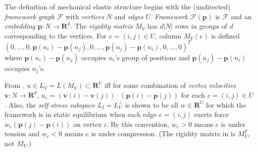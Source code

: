 \documentclass{article}
\def\Reals{\ensuremath{\mathbf R}}
\newcommand{\extra}[1]{}
\begin{document}
The definition of mechanical elastic structure begins with the 
(undirected) \textit{framework graph} $\mathcal{F}$ with \textit{vertices}
$N$ and \textit{edges} $U$.  \textit{Framework} $\mathcal{F}(\mathbf{p})$ 
is 
$\mathcal{F}$ and an \textit{embedding} 
$\mathbf{p}:N\rightarrow \Reals^d$.  
The \textit{rigidity matrix} $M_V$ 
has $d|N|$ rows in groups of $d$ corresponding to the vertices.
For $e=(i,j)\in U$, column $M_V(e)$ 
is defined \cite{RigidityBook}\\
$(0, \ldots,0, \mathbf{p}(n_i)-\mathbf{p}(n_j),0,\ldots,
\mathbf{p}(n_j)-\mathbf{p}(n_i), 0, \ldots,0)^T$\\
where $\mathbf{p}(n_i)-\mathbf{p}(n_j)$ occupies 
$n_i$'s group of positions
and $\mathbf{p}(n_j)-\mathbf{p}(n_i)$
occupies $n_j$'s.
\extra{This definition is echoed from the 
literature \cite{RigidityBook} on rigidity theory, except
we interchange rows and columns.  Just as we deemphasized nodes of electrical
networks, we will use merely the row space of $M_V$ for most of what follows.
}
\extra{The rigidity matrix as a 
function of the embedding $\mathbf{p}$ is denoted
$M_V(\mathbf{p})$.  The row vector $\mathbf{p}$ left multiplied with
$M_V(\mathbf{p})$
is the row tuple denoted $\mathbf{L}=\mathbf{p}M_V(\mathbf{p})$  Then, 
$\mathbf{L}_e$ $=$ 
$(\mathbf{p}M_V(\mathbf{p}))_e$ $=$ $|\mathbf{p}_i-\mathbf{p}_j|^2$ for
each edge $e=(i,j)$.  Now if each $\mathbf{p}_i$ is a differentiable function
of $t$, $d\mathbf{L}/dt$ $=$ $2\mathbf{p}'M_V(\mathbf{p})$.  Framework
$\mathcal{F}(\mathbf{p})$ is \textit{first-order rigid} when 
$d\mathbf{L}/dt$ $=$ $0$ for all $\mathbf{p}'$ implies 
$|\mathbf{p}_i-\mathbf{p}_j|^2$ is constant for all pairs $i$, $j$, not just
endpoints of edges. 
}%
From \cite{RigidityBook},
$u\in L_V=L(M_V)\subset\Reals^U$ 
iff 
for some combination of \textit{vertex velocities}
$\mathbf{v}:N\rightarrow\Reals^d$,
$u_e=(\mathbf{v}(i)-\mathbf{v}(j))\cdot(\mathbf{p}(i)-\mathbf{p}(j))$
for each $e=(i,j)\in U$.
Also,
the \textit{self-stress subspace} $L_I=L_V^\perp$%
is shown to be all $w\in\Reals^U$
for which the framework is in static
equilibrium when each edge $e=(i,j)$ exerts force 
$w_e(\mathbf{p}(j)-\mathbf{p}(i))$ on vertex $i$.  By this convention, 
$w_e>0$ means $e$ is under tension and $w_e<0$ means $e$ is under 
compression.  
(The rigidity matrix in \cite{RigidityBook} is $M_V^T$, not $M_V$.)
\end{document}
